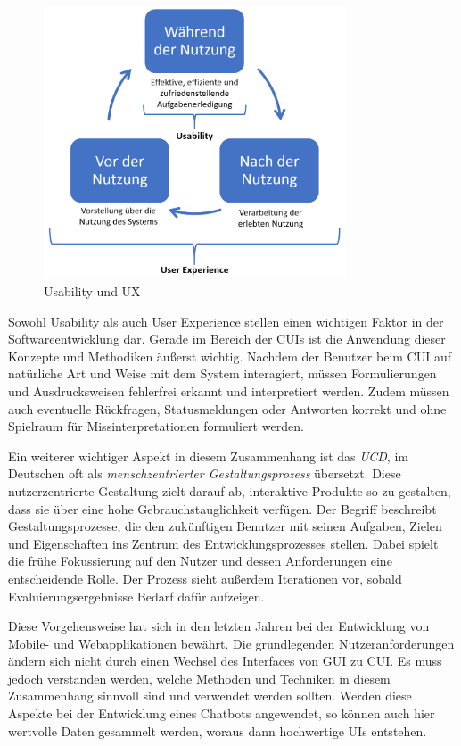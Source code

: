 \begin{figure}[htb]
    \centering
    \includegraphics[width=0.8\textwidth]{bilder/usability-user-experience_v2.png}
    \caption{Usability und \acl{UX}}
    \label{fig:usability-user-experience}
\end{figure}

Sowohl Usability als auch User Experience stellen einen wichtigen Faktor in der Softwareentwicklung dar. Gerade im Bereich der \aclp{CUI} ist die Anwendung dieser Konzepte und Methodiken äußerst wichtig. Nachdem der Benutzer beim \ac{CUI} auf natürliche Art und Weise mit dem System interagiert, müssen Formulierungen und Ausdrucksweisen fehlerfrei erkannt und interpretiert werden. Zudem müssen auch eventuelle Rückfragen, Statusmeldungen oder Antworten korrekt und ohne Spielraum für Missinterpretationen formuliert werden. 

Ein weiterer wichtiger Aspekt in diesem Zusammenhang ist das \textit{\ac{UCD}}, im Deutschen oft als \textit{menschzentrierter Gestaltungsprozess} übersetzt. Diese nutzerzentrierte Gestaltung zielt darauf ab, interaktive Produkte so zu gestalten, dass sie über eine hohe Gebrauchstauglichkeit verfügen. Der Begriff beschreibt Gestaltungsprozesse, die den zukünftigen Benutzer mit seinen Aufgaben, Zielen und Eigenschaften ins Zentrum des Entwicklungsprozesses stellen. Dabei spielt die frühe Fokussierung auf den Nutzer und dessen Anforderungen eine entscheidende Rolle. Der Prozess sieht außerdem Iterationen vor, sobald Evaluierungsergebnisse Bedarf dafür aufzeigen. \cite[S. 67-68]{tryfonas_human_2016} 

Diese Vorgehensweise hat sich in den letzten Jahren bei der Entwicklung von Mobile- und Webapplikationen bewährt. Die grundlegenden Nutzeranforderungen ändern sich nicht durch einen Wechsel des Interfaces von \ac{GUI} zu \ac{CUI}. Es muss jedoch verstanden werden, welche Methoden und Techniken in diesem Zusammenhang sinnvoll sind und verwendet werden sollten. Werden diese Aspekte bei der Entwicklung eines Chatbots angewendet, so können auch hier wertvolle Daten gesammelt werden, woraus dann hochwertige \aclp{UI} entstehen. \cite{chandra_how_2018} 

